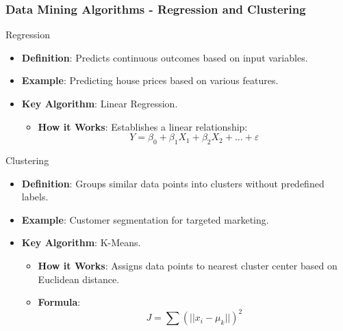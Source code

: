\documentclass{beamer}
\begin{document}
\begin{frame}[fragile]
    \frametitle{Data Mining Algorithms - Regression and Clustering}
    \begin{block}{Regression}
        \begin{itemize}
            \item \textbf{Definition}: Predicts continuous outcomes based on input variables.
            \item \textbf{Example}: Predicting house prices based on various features.
            \item \textbf{Key Algorithm}: Linear Regression.
            \begin{itemize}
                \item \textbf{How it Works}: Establishes a linear relationship:
                \begin{equation}
                    Y = \beta_0 + \beta_1X_1 + \beta_2X_2 + \ldots + \varepsilon
                \end{equation}
            \end{itemize}
        \end{itemize}
    \end{block}
    
    \begin{block}{Clustering}
        \begin{itemize}
            \item \textbf{Definition}: Groups similar data points into clusters without predefined labels.
            \item \textbf{Example}: Customer segmentation for targeted marketing.
            \item \textbf{Key Algorithm}: K-Means.
            \begin{itemize}
                \item \textbf{How it Works}: Assigns data points to nearest cluster center based on Euclidean distance.
                \item \textbf{Formula}:
                \begin{equation}
                    J = \sum (||x_i - \mu_k||)^2
                \end{equation}
            \end{itemize}
        \end{itemize}
    \end{block}
\end{frame}
\end{document}
